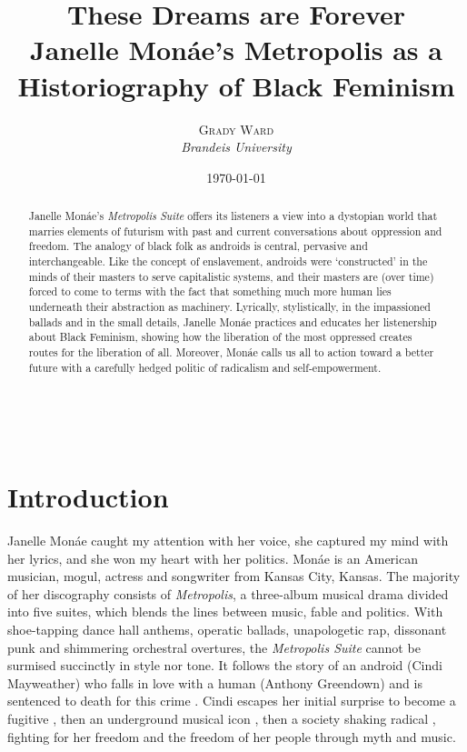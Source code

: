 \documentclass[a4paper, 11pt]{article} %
\title{\linespread{2.1}\textbf{These Dreams are Forever}\\ %
Janelle Mon\'ae's Metropolis as a Historiography of Black Feminism} %
\author{\textsc{Grady Ward} %
\\{\textit{Brandeis University}}} %
\date{\today} %
\makeatletter
\renewcommand{\maketitle}{ %
\begin{flushright} %
	{\LARGE\@title} %

	\vspace{40pt} %

	{\large\@author} %
	\\\@date %

	\vspace{30pt} %
\end{flushright}
}
\makeatother
\begin{document}
\maketitle %


\begin{abstract}

Janelle Mon\'ae's \emph{Metropolis Suite} offers its listeners a view into a dystopian world that marries elements of futurism with past and current conversations about oppression and freedom.
The analogy of black folk as androids is central, pervasive and interchangeable. 
Like the concept of enslavement, androids were `constructed' in the minds of their masters to serve capitalistic systems, and their masters are (over time) forced to come to terms with the fact that something much more human lies underneath their abstraction as machinery. 
Lyrically, stylistically, in the impassioned ballads and in the small details, Janelle Mon\'ae practices and educates her listenership about Black Feminism, showing how the liberation of the most oppressed creates routes for the liberation of all.
Moreover, Mon\'ae calls us all to action toward a better future with a carefully hedged politic of radicalism and self-empowerment.

\end{abstract}

\vspace{30pt}


\section*{Introduction}

Janelle Mon\'ae caught my attention with her voice, she captured my mind with her lyrics, and she won my heart with her politics.
Mon\'ae is an American musician, mogul, actress and songwriter from Kansas City, Kansas.
The majority of her discography consists of \emph{Metropolis}, a three-album musical drama divided into five suites, which blends the lines between music, fable and politics.
With shoe-tapping dance hall anthems, operatic ballads, unapologetic rap, dissonant punk and shimmering orchestral overtures, the \emph{Metropolis Suite} cannot be surmised succinctly in style nor tone.
It follows the story of an android (Cindi Mayweather) who falls in love with a human (Anthony Greendown) and is sentenced to death for this crime \cite{wolfmasters}.
Cindi escapes her initial surprise to become a fugitive \cite{manymoons}, then an underground musical icon \cite{favoritefugitive}, then a society shaking radical \cite{fiveseveneighttwoone}, fighting for her freedom and the freedom of her people through myth and music.
\end{document}
